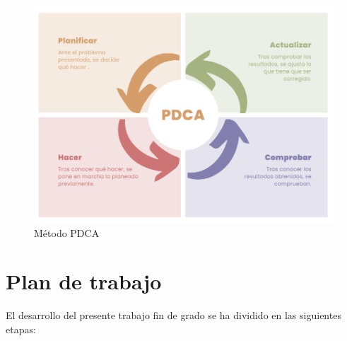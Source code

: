 \begin{figure} [h!]
	\begin{center}
			\includegraphics[width=16cm]{figs/PDCA.png}
		\end{center}
	\caption{Método PDCA} 
\label{fig:PDCA}
\end{figure}


\section{Plan de trabajo}
\label{sec:plantrabajo}

El desarrollo del presente trabajo fin de grado se ha dividido en las siguientes etapas: 

